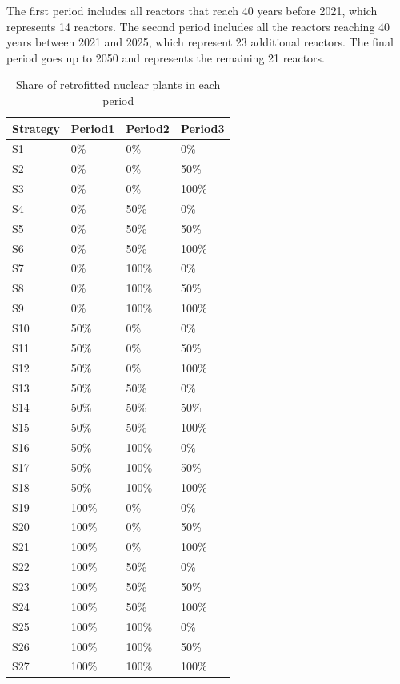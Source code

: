 \clearpage

The first period includes all reactors that reach 40 years before 2021, which represents 14 reactors. The second period includes all the reactors reaching 40 years between 2021 and 2025, which represent 23 additional reactors. The final period goes up to 2050 and represents the remaining 21 reactors.

\begin{table}[!hb]
	\centering
	\caption{Share of retrofitted nuclear plants in each period}
	\label{tab:shareNukeRetrofit}
	\small
	\begin{tabular}{llll}
		\toprule
		Strategy & Period1 & Period2 & Period3 \\
		\midrule
		S1 & 0\% & 0\% & 0\% \\
		S2 & 0\% & 0\% & 50\% \\
		S3 & 0\% & 0\% & 100\% \\
		S4 & 0\% & 50\% & 0\% \\
		S5 & 0\% & 50\% & 50\% \\
		S6 & 0\% & 50\% & 100\% \\
		S7 & 0\% & 100\% & 0\% \\
		S8 & 0\% & 100\% & 50\% \\
		S9 & 0\% & 100\% & 100\% \\
		S10 & 50\% & 0\% & 0\% \\
		S11 & 50\% & 0\% & 50\% \\
		S12 & 50\% & 0\% & 100\% \\
		S13 & 50\% & 50\% & 0\% \\
		S14 & 50\% & 50\% & 50\% \\
		S15 & 50\% & 50\% & 100\% \\
		S16 & 50\% & 100\% & 0\% \\
		S17 & 50\% & 100\% & 50\% \\
		S18 & 50\% & 100\% & 100\% \\
		S19 & 100\% & 0\% & 0\% \\
		S20 & 100\% & 0\% & 50\% \\
		S21 & 100\% & 0\% & 100\% \\
		S22 & 100\% & 50\% & 0\% \\
		S23 & 100\% & 50\% & 50\% \\
		S24 & 100\% & 50\% & 100\% \\
		S25 & 100\% & 100\% & 0\% \\
		S26 & 100\% & 100\% & 50\% \\
		S27 & 100\% & 100\% & 100\% \\
		\bottomrule
	\end{tabular}
\end{table}

